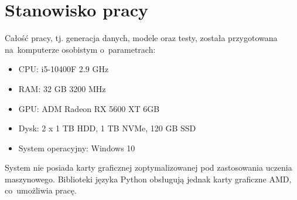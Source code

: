 \section{Stanowisko pracy}
Całość pracy, tj. generacja danych, modele oraz testy, została przygotowana na~komputerze osobistym o~parametrach:

\begin{itemize}[label=-,labelsep=0.4cm,leftmargin=0.6cm]
\item CPU: i5-10400F 2.9 GHz
\item RAM: 32 GB 3200 MHz
\item GPU: ADM Radeon RX 5600 XT 6GB
\item Dysk: 2 x 1 TB HDD, 1 TB NVMe, 120 GB SSD
\item System operacyjny: Windows 10
\end{itemize}
System nie posiada karty graficznej zoptymalizowanej pod zastosowania uczenia maszynowego.
Biblioteki języka Python obsługują jednak karty graficzne AMD, co~umożliwia pracę.